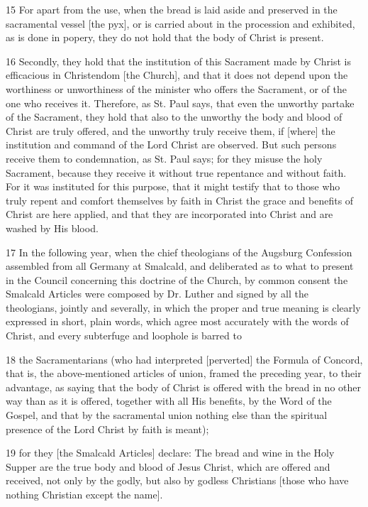 15 For apart from the use, when the bread is laid aside and preserved in the sacramental vessel [the pyx], or is carried about in the procession and exhibited, as is done in popery, they do not hold that the body of Christ is present.

16 Secondly, they hold that the institution of this Sacrament made by Christ is efficacious in Christendom [the Church], and that it does not depend upon the worthiness or unworthiness of the minister who offers the Sacrament, or of the one who receives it. Therefore, as St. Paul says, that even the unworthy partake of the Sacrament, they hold that also to the unworthy the body and blood of Christ are truly offered, and the unworthy truly receive them, if [where] the institution and command of the Lord Christ are observed. But such persons receive them to condemnation, as St. Paul says; for they misuse the holy Sacrament, because they receive it without true repentance and without faith. For it was instituted for this purpose, that it might testify that to those who truly repent and comfort themselves by faith in Christ the grace and benefits of Christ are here applied, and that they are incorporated into Christ and are washed by His blood.

17 In the following year, when the chief theologians of the Augsburg Confession assembled from all Germany at Smalcald, and deliberated as to what to present in the Council concerning this doctrine of the Church, by common consent the Smalcald Articles were composed by Dr. Luther and signed by all the theologians, jointly and severally, in which the proper and true meaning is clearly expressed in short, plain words, which agree most accurately with the words of Christ, and every subterfuge and loophole is barred to

18 the Sacramentarians (who had interpreted [perverted] the Formula of Concord, that is, the above-mentioned articles of union, framed the preceding year, to their advantage, as saying that the body of Christ is offered with the bread in no other way than as it is offered, together with all His benefits, by the Word of the Gospel, and that by the sacramental union nothing else than the spiritual presence of the Lord Christ by faith is meant);

19 for they [the Smalcald Articles] declare: The bread and wine in the Holy Supper are the true body and blood of Jesus Christ, which are offered and received, not only by the godly, but also by godless Christians [those who have nothing Christian except the name].

